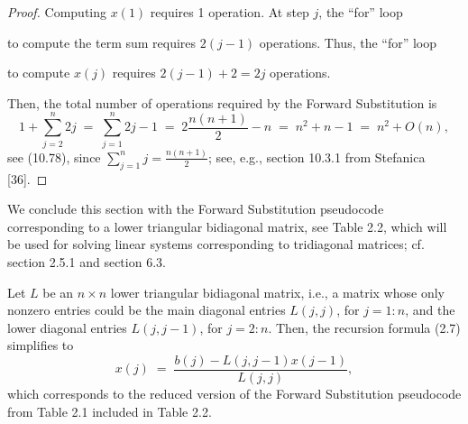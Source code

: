 \begin{proof}
Computing $x(1)$ requires 1 operation. At step $j$, the ``for'' loop
\begin{center}
\end{center}
to compute the term sum requires $2(j-1)$ operations. Thus, the ``for'' loop
\begin{center}
\end{center}
to compute $x(j)$ requires $2(j-1)+2 = 2j$ operations.

Then, the total number of operations required by the Forward Substitution is
\begin{equation}
1 + \sum_{j=2}^n 2j \;=\; \sum_{j=1}^n 2j - 1 \;=\; 2\frac{n(n+1)}{2} - n \;=\;
n^2+n-1 \;=\; n^2 + O(n),
\end{equation}
see (10.78), since $\sum_{j=1}^n j = \frac{n(n+1)}{2}$; see, e.g., section 10.3.1 from
Stefanica [36].
\end{proof}

We conclude this section with the Forward Substitution pseudocode corresponding to a
lower triangular bidiagonal matrix, see Table 2.2, which will be used for solving
linear systems corresponding to tridiagonal matrices; cf. section 2.5.1 and section
6.3.

Let $L$ be an $n\times n$ lower triangular bidiagonal matrix, i.e., a matrix whose only
nonzero entries could be the main diagonal entries $L(j,j)$, for $j=1:n$, and the lower
diagonal entries $L(j,j-1)$, for $j=2:n$. Then, the recursion formula (2.7) simplifies
to
\[
x(j) \;=\; \frac{b(j) - L(j,j-1)x(j-1)}{L(j,j)},
\]
which corresponds to the reduced version of the Forward Substitution pseudocode from
Table 2.1 included in Table 2.2.

